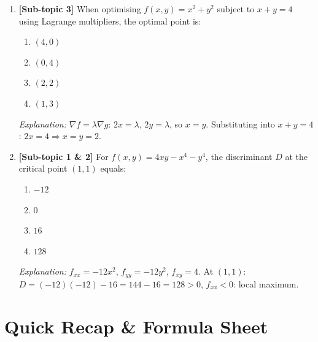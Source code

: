 \documentclass[12pt,a4paper]{article}
\begin{document}
\begin{enumerate}
  \item \textbf{[Sub-topic 3]} When optimising $f(x,y) = x^{2}+y^{2}$ subject to $x+y = 4$ using Lagrange multipliers, the optimal point is:
  \begin{enumerate}[label=(\Alph*)]
    \item $(4, 0)$
    \item $(0, 4)$
    \item \textbf{$(2, 2)$}
    \item $(1, 3)$
  \end{enumerate}
  \textit{Explanation:} $\nabla f = \lambda \nabla g$: $2x = \lambda$, $2y = \lambda$, so $x=y$. Substituting into $x+y=4$: $2x=4 \Rightarrow x=y=2$.

  \item \textbf{[Sub-topic 1 \& 2]} For $f(x,y) = 4xy - x^{4} - y^{4}$, the discriminant $D$ at the critical point $(1,1)$ equals:
  \begin{enumerate}[label=(\Alph*)]
    \item $-12$
    \item $0$
    \item $16$
    \item \textbf{$128$}
  \end{enumerate}
  \textit{Explanation:} $f_{xx}=-12x^{2}$, $f_{yy}=-12y^{2}$, $f_{xy}=4$. At $(1,1)$: $D=(-12)(-12)-16=144-16=128>0$, $f_{xx}<0$: local maximum.

\end{enumerate}

\section{Quick Recap \& Formula Sheet}
\end{document}
